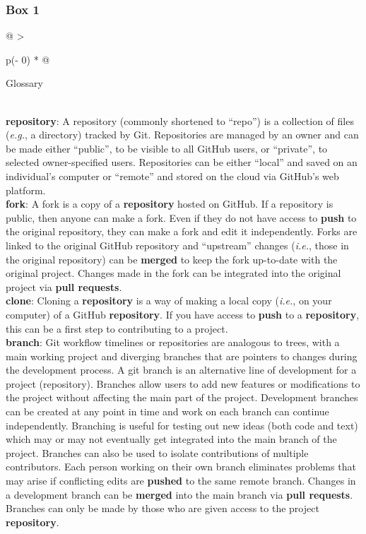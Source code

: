 \hypertarget{definitions}{%
\subsubsection{Box 1}\label{definitions}}

\begin{tablenos:no-prefix-table-caption}

\begin{longtable}[]{@{}
  >{\raggedright\arraybackslash}p{(\columnwidth - 0\tabcolsep) * }@{}}
\toprule
\begin{minipage}[b]{\linewidth}\raggedright
Glossary
\end{minipage} \\
\midrule
\endhead
\textbf{repository}: A repository (commonly shortened to ``repo'') is a collection of files (\emph{e.g.}, a directory) tracked by Git. Repositories are managed by an owner and can be made either ``public'', to be visible to all GitHub users, or ``private'', to selected owner-specified users. Repositories can be either ``local'' and saved on an individual's computer or ``remote'' and stored on the cloud via GitHub's web platform. \\
\textbf{fork}: A fork is a copy of a \textbf{repository} hosted on GitHub. If a repository is public, then anyone can make a fork. Even if they do not have access to \textbf{push} to the original repository, they can make a fork and edit it independently. Forks are linked to the original GitHub repository and ``upstream'' changes (\emph{i.e.}, those in the original repository) can be \textbf{merged} to keep the fork up-to-date with the original project. Changes made in the fork can be integrated into the original project via \textbf{pull requests}. \\
\textbf{clone}: Cloning a \textbf{repository} is a way of making a local copy (\emph{i.e.}, on your computer) of a GitHub \textbf{repository}. If you have access to \textbf{push} to a \textbf{repository}, this can be a first step to contributing to a project. \\
\textbf{branch}: Git workflow timelines or repositories are analogous to trees, with a main working project and diverging branches that are pointers to changes during the development process. A git branch is an alternative line of development for a project (repository). Branches allow users to add new features or modifications to the project without affecting the main part of the project. Development branches can be created at any point in time and work on each branch can continue independently. Branching is useful for testing out new ideas (both code and text) which may or may not eventually get integrated into the main branch of the project. Branches can also be used to isolate contributions of multiple contributors. Each person working on their own branch eliminates problems that may arise if conflicting edits are \textbf{pushed} to the same remote branch. Changes in a development branch can be \textbf{merged} into the main branch via \textbf{pull requests}. Branches can only be made by those who are given access to the project \textbf{repository}. \\

\end{longtable}
\end{tablenos:no-prefix-table-caption}
